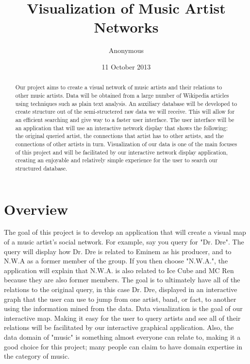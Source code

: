 \documentclass{sig-alternate}
\begin{document}
\title{Visualization of Music Artist Networks }
\author{
\alignauthor
Anonymous
}


\date{11 October 2013}
\maketitle
\begin {abstract}
Our project aims to create a visual network of music artists 
and their relations to other music artists. Data will be obtained 
from a large number of Wikipedia articles using techniques such 
as plain text analysis. An auxiliary database will be developed to 
create structure out of the semi-structered raw data we will receive. 
This will allow for an efficient searching and give way to a faster user interface. 
The user interface will be an application that will use an interactive network 
display that shows the following: the original queried artist, the 
connections that artist has to other artists, and the connections 
of other artists in turn. Visualization of our data is one of 
the main focuses of this project and will be facilitated by our
 interactive network display application, creating an enjoyable and relatively 
simple experience for the user to search our structured database.

\end{abstract}

\section{Overview}
\label{overview}
The goal of this project is to develop an application that will create 
a visual map of a music artist's social network. For example, say you query 
for "Dr. Dre". The query will display how Dr. Dre is related to Eminem as 
his producer, and to N.W.A as a former member of the group. If you then 
choose "N.W.A.", the application will explain that N.W.A. is also related to 
 Ice Cube and MC Ren because they are also former members. The goal is 
to ultimately have all of the relations to the original query, in this case Dr. Dre, 
displayed in an interactive graph that the user can use to jump from one 
artist, band, or fact, to another using the information mined from the data. 
Data visualization is the goal of our interactive map. Making it easy 
for the user to query artists and see all of their relations will 
be facilitated by our interactive graphical application. Also, the data domain 
of "music" is something almost everyone can relate to, making it 
a good choice for this project; many people can claim to have domain 
expertise in the category of music.
\end{document}
